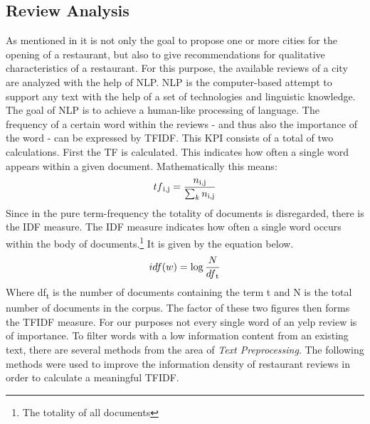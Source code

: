 \subsection{Review Analysis}
\label{subsec:review}
As mentioned in  it is not only the goal to propose one or more cities for the opening of a restaurant,
but also to give recommendations for qualitative characteristics of a restaurant.
\newline
For this purpose, the available reviews of a city are analyzed with the help of \ac{NLP}.
\ac{NLP} is the computer-based attempt to support any text with the help of a set of technologies and linguistic knowledge.\cite{Liddy01}
The goal of \ac{NLP} is to achieve a human-like processing of language.\cite{Liddy01}
The frequency of a certain word within the reviews - and thus also the importance of the word - can be expressed by \ac{TFIDF}.
This \ac{KPI} consists of a total of two calculations.
First the \ac{TF} is calculated.
This indicates how often a single word appears within a given document.
Mathematically this means:
\newline
\begin{equation}
  tf\textsubscript{i,j} = \frac{n\textsubscript{i,j}}{\sum_{k} n\textsubscript{i,j}}
	\label{eq:tf}
\end{equation}
Since in the pure term-frequency the totality of documents is disregarded, there is the \ac{IDF} measure.
The \ac{IDF} measure indicates how often a single word occurs within the body of documents.\footnote{The totality of all documents}
It is given by the equation below.
\newline
\begin{equation}
  idf(w) = \log \frac{N}{df\textsubscript{t}}
	\label{eq:tf}
\end{equation}
Where df\textsubscript{t} is the number of documents containing the term t and N is the total number of documents in the corpus.
The factor of these two figures then forms the \ac{TFIDF} measure.\cite{droid18}
\newline
For our purposes not every single word of an yelp review is of importance.
To filter words with a low information content from an existing text, there are several methods from the area of \textit{Text Preprocessing}.
The following methods were used to improve the information density of restaurant reviews in order to calculate a meaningful \ac{TFIDF}.
